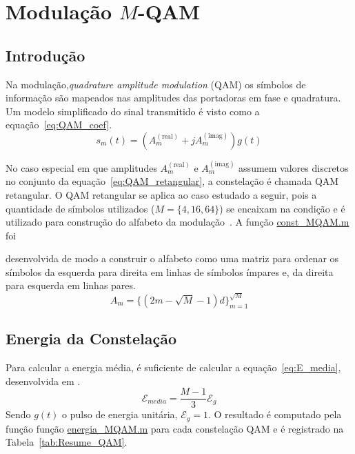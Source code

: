 \section{Modulação \texorpdfstring{$M$}{M}-QAM}

\subsection{Introdução}
Na modulação,\textit{quadrature amplitude modulation} (QAM) os símbolos de informação são mapeados nas amplitudes das portadoras em fase e quadratura. Um modelo simplificado do sinal transmitido é visto como a equação~\ref{eq:QAM_coef}.
\begin{equation}
    s_m(t) = ( A_m^{(\text{real})} + j A_m^{(\text{imag})}) g(t)
    \label{eq:QAM_coef}
\end{equation}

No caso especial em que amplitudes $A_m^{(\text{real})}$ e $A_m^{(\text{imag})}$ assumem valores discretos no conjunto da equação~\ref{eq:QAM_retangular}, a constelação é chamada QAM retangular. O QAM retangular se aplica ao caso estudado a seguir, pois a quantidade de símbolos utilizados ($M = \{4, 16, 64\}$) se encaixam na condição e é utilizado para construção do alfabeto da modulação~\cite{Cecilio}. A função \href{https://raw.githubusercontent.com/lucasabdalah/Courses-HWs/SCD/Sistemas%20de%20Comunicacoes%20Digitais/matlab/problema1/const_MQAM.m}{\colorbox{gray!10}{\color{red}const\_MQAM.m}} foi

desenvolvida de modo a construir o alfabeto como uma matriz para ordenar os símbolos da esquerda para direita em linhas de símbolos ímpares e, da direita para esquerda em linhas pares.
\begin{equation}
    A_m = \{(2m -\sqrt{M} - 1)d \}_{m=1}^{\sqrt{M}}
    \label{eq:QAM_retangular}
\end{equation}


\subsection{Energia da Constelação} 
Para calcular a energia média, é suficiente de calcular a equação~\ref{eq:E_media}, desenvolvida em \cite{Cecilio,Proakis}.
\begin{equation}
    \mathcal{E}_{media} = \frac{M-1}{3} \mathcal{E}_g
    \label{eq:E_media}
\end{equation}
Sendo $g(t)$ o pulso de energia unitária, $\mathcal{E}_g = 1$. O resultado é computado pela função função \href{https://raw.githubusercontent.com/lucasabdalah/Courses-HWs/SCD/Sistemas%20de%20Comunicacoes%20Digitais/matlab/problema1/energia_MQAM.m}{\colorbox{gray!10}{\color{red}energia\_MQAM.m}} para cada constelação QAM e é registrado na Tabela~\ref{tab:Resume_QAM}.

